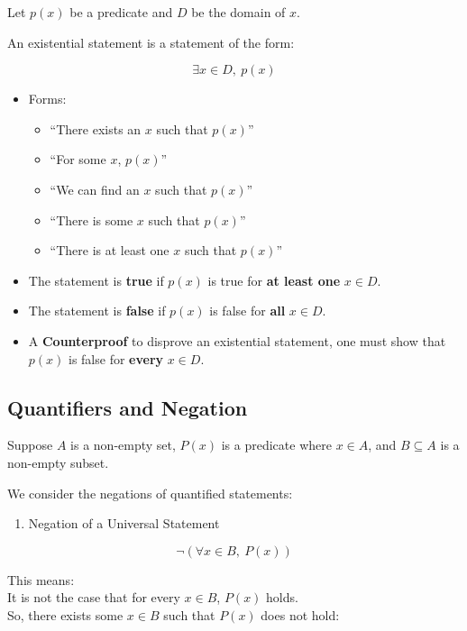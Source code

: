 \documentclass[
]{book}
\providecommand{\tightlist}{%
  \setlength{\itemsep}{0pt}\setlength{\parskip}{0pt}}
\theoremstyle{definition}
\theoremstyle{definition}
\theoremstyle{definition}
\theoremstyle{definition}
\theoremstyle{remark}
\begin{document}
Let \(p(x)\) be a predicate and \(D\) be the domain of \(x\).

An existential statement is a statement of the form:

\[ \exists x \in D,\ p(x) \]

\begin{itemize}
\tightlist
\item
  Forms:

  \begin{itemize}
  \tightlist
  \item
    ``There exists an \(x\) such that \(p(x)\)''
  \item
    ``For some \(x\), \(p(x)\)''
  \item
    ``We can find an \(x\) such that \(p(x)\)''
  \item
    ``There is some \(x\) such that \(p(x)\)''
  \item
    ``There is at least one \(x\) such that \(p(x)\)''
  \end{itemize}
\item
  The statement is \textbf{true} if \(p(x)\) is true for \textbf{at least one} \(x \in D\).
\item
  The statement is \textbf{false} if \(p(x)\) is false for \textbf{all} \(x \in D\).
\item
  A \textbf{Counterproof} to disprove an existential statement, one must show that \(p(x)\) is false for \textbf{every} \(x \in D\).
\end{itemize}

\subsection{Quantifiers and Negation}\label{quantifiers-and-negation}

Suppose \(A\) is a non-empty set, \(P(x)\) is a predicate where \(x \in A\), and \(B \subseteq A\) is a non-empty subset.

We consider the negations of quantified statements:

\begin{enumerate}
\def\labelenumi{\arabic{enumi}.}
\tightlist
\item
  Negation of a Universal Statement
\end{enumerate}

\[
\neg (\forall x \in B,\ P(x))
\]

This means:\\
It is not the case that for every \(x \in B\), \(P(x)\) holds.\\
So, there exists some \(x \in B\) such that \(P(x)\) does not hold:
\end{document}
